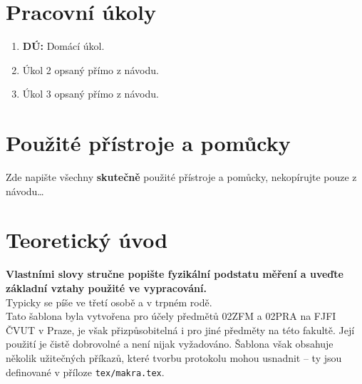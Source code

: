 
\section{Pracovní úkoly}

\begin{enumerate}
\item \textbf{DÚ:} Domácí úkol.

\item Úkol 2 opsaný přímo z návodu.

\item Úkol 3 opsaný přímo z návodu.
\end{enumerate}



\section{Použité přístroje a pomůcky}
		Zde napište všechny \textbf{skutečně} použité přístroje a pomůcky, nekopírujte pouze z návodu\dots
		

\section{Teoretický úvod}
\textbf{Vlastními slovy stručne popište fyzikální podstatu měření a uveďte základní vztahy použité ve vypracování.}\\ Typicky se píše ve třetí osobě a v trpném rodě.\\
		Tato šablona byla vytvořena pro účely předmětů 02ZFM a 02PRA na FJFI ČVUT v Praze, je však přizpůsobitelná i pro jiné předměty na této fakultě. Její použití je čistě dobrovolné a není nijak vyžadováno. Šablona však obsahuje několik užitečných příkazů, které tvorbu protokolu mohou usnadnit -- ty jsou definované v příloze \verb|tex/makra.tex|.
		 
